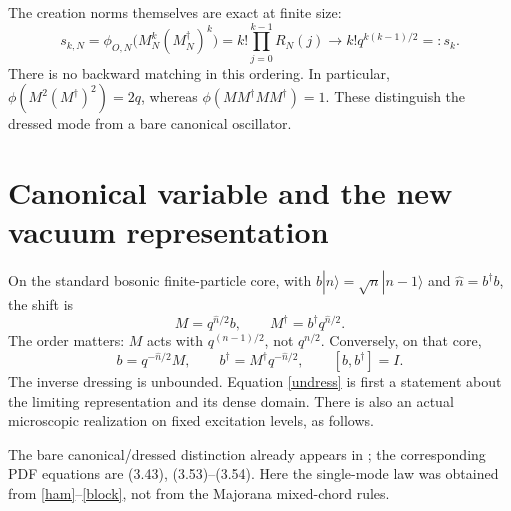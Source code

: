 \documentclass[11pt]{article}
\newcommand{\nn}{\hat n}
\begin{document}
The creation norms themselves are exact at finite size:
\begin{equation}\label{creationnorm}
 s_{k,N}=\phi_{O,N}\bigl(M_N^k(M_N^\dagger)^k\bigr)
 =k!\prod_{j=0}^{k-1}R_N(j)
 \longrightarrow k!q^{k(k-1)/2}=:s_k.
\end{equation}
There is no backward matching in this ordering. In particular,
$\phi(M^2(M^\dagger)^2)=2q$, whereas
$\phi(MM^\dagger MM^\dagger)=1$. These distinguish the dressed mode
from a bare canonical oscillator.

\newpage
\section{Canonical variable and the new vacuum representation}
On the standard bosonic finite-particle core, with
$b|n\rangle=\sqrt n|n-1\rangle$ and $\nn=b^\dagger b$, the shift is
\begin{equation}\label{dress}
 M=q^{\nn/2}b,\qquad M^\dagger=b^\dagger q^{\nn/2}.
\end{equation}
The order matters: $M$ acts with $q^{(n-1)/2}$, not $q^{n/2}$.
Conversely, on that core,
\begin{equation}\label{undress}
 b=q^{-\nn/2}M,\qquad b^\dagger=M^\dagger q^{-\nn/2},
 \qquad [b,b^\dagger]=I.
\end{equation}
The inverse dressing is unbounded. Equation \eqref{undress} is first
a statement about the limiting representation and its dense domain.
There is also an actual microscopic realization on fixed excitation
levels, as follows.

The bare canonical/dressed distinction already appears in
\cite[HTML Eqs.~(75), (85)--(86)]{RX}; the corresponding PDF equations
are (3.43), (3.53)--(3.54). Here the single-mode law was obtained from
\eqref{ham}--\eqref{block}, not from the Majorana mixed-chord rules.
\end{document}
